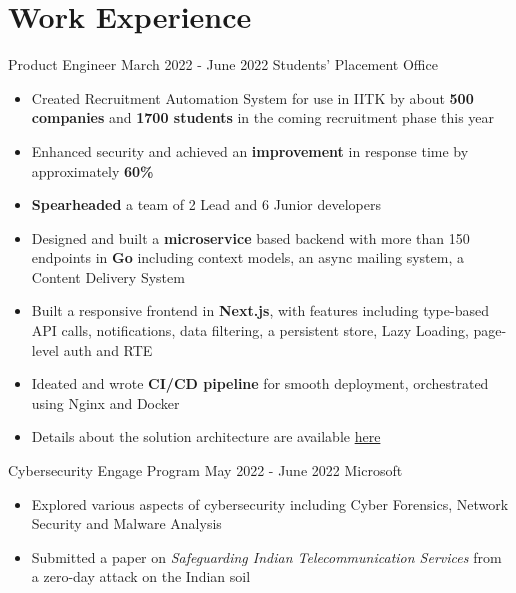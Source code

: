 \section*{\sc Work Experience}
\vspace{-2mm}
\hrulefill
\vspace{1mm}

\excventry
{Product Engineer}
{March 2022 - June 2022}
{Students' Placement Office}
{
  \begin{itemize}
    \item Created Recruitment Automation System for use in IITK by about \textbf{500 companies} and \textbf{1700 students} in the coming recruitment phase this year  
    \item Enhanced security and achieved an \textbf{improvement} in response time by approximately \textbf{60\%}
    \item \textbf{Spearheaded} a team of 2 Lead and 6 Junior developers
    \item Designed and built a \textbf{microservice} based backend with more than 150 endpoints in \textbf{Go} including context models, an async mailing system, a Content Delivery System  
    \item Built a responsive frontend in \textbf{Next.js}, with features including type-based API calls, notifications, data filtering, a persistent store, Lazy Loading, page-level auth and RTE
    \item Ideated and wrote \textbf{CI/CD pipeline} for smooth deployment, orchestrated using Nginx and Docker
    \item Details about the solution architecture are available \href{}{here}
  \end{itemize}
}


\excventry
{Cybersecurity Engage Program}
{May 2022 - June 2022}
{Microsoft}
{
  \begin{itemize}
    \item Explored various aspects of cybersecurity including Cyber Forensics, Network Security and Malware Analysis
    \item Submitted a paper on \textit{Safeguarding Indian Telecommunication Services} from a zero-day attack on the Indian soil
  \end{itemize}
}

